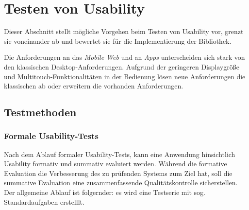\section{Testen von Usability}
\label{usability_testing}

Dieser Abschnitt stellt mögliche Vorgehen beim Testen von Usability vor, grenzt sie voneinander ab und bewertet sie für die Implementierung der Bibliothek. 

Die Anforderungen an das \textit{Mobile Web} und an \textit{Apps} unterscheiden sich stark von den klassischen Desktop-Anforderungen. Aufgrund der geringeren Displaygröße und Multitouch-Funktionalitäten in der Bedienung lösen neue Anforderungen die klassischen ab oder erweitern die vorhanden Anforderungen. 

\subsection{Testmethoden \label{sec_testmethoden}}

\subsubsection{Formale Usability-Tests}

Nach dem Ablauf formaler Usability-Tests, kann eine Anwendung hinsichtlich Usability formativ und summativ evaluiert werden. Während die formative Evaluation die Verbesserung des zu prüfenden Systems zum Ziel hat, soll die summative Evaluation eine zusammenfassende Qualitätskontrolle sicherstellen. 
Der allgemeine Ablauf ist folgernder: es wird eine Testserie mit sog. Standardaufgaben erstelllt. 

\cite{usabilityblog_wasBeachten}

\cite{usabilityblog_eResult}
